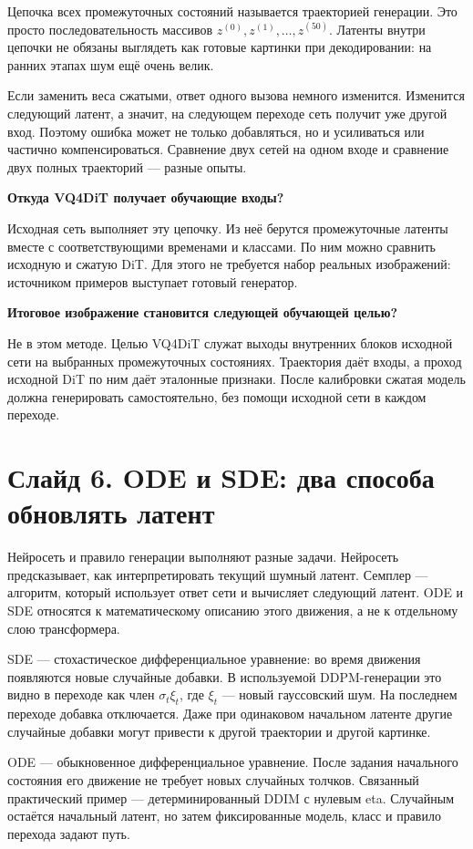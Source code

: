 \documentclass[a4paper,11pt]{article}
\newcommand{\slide}[2]{\clearpage\section*{Слайд #1. #2}}
\newcommand{\question}[1]{\par\textbf{#1}\par}
\begin{document}
Цепочка всех промежуточных состояний называется траекторией генерации.
Это просто последовательность массивов $z^{(0)},z^{(1)},\ldots,z^{(50)}$.
Латенты внутри цепочки не обязаны выглядеть как готовые картинки при
декодировании: на ранних этапах шум ещё очень велик.

Если заменить веса сжатыми, ответ одного вызова немного изменится.
Изменится следующий латент, а значит, на следующем переходе сеть
получит уже другой вход. Поэтому ошибка может не только добавляться,
но и усиливаться или частично компенсироваться. Сравнение двух сетей
на одном входе и сравнение двух полных траекторий --- разные опыты.

\question{Откуда VQ4DiT получает обучающие входы?}
Исходная сеть выполняет эту цепочку. Из неё берутся промежуточные
латенты вместе с соответствующими временами и классами. По ним можно
сравнить исходную и сжатую DiT. Для этого не требуется набор реальных
изображений: источником примеров выступает готовый генератор.

\question{Итоговое изображение становится следующей обучающей целью?}
Не в этом методе. Целью VQ4DiT служат выходы внутренних блоков исходной
сети на выбранных промежуточных состояниях. Траектория даёт входы,
а проход исходной DiT по ним даёт эталонные признаки.
После калибровки сжатая модель должна генерировать самостоятельно,
без помощи исходной сети в каждом переходе.

\slide{6}{ODE и SDE: два способа обновлять латент}
Нейросеть и правило генерации выполняют разные задачи. Нейросеть
предсказывает, как интерпретировать текущий шумный латент.
Семплер --- алгоритм, который использует ответ сети и вычисляет
следующий латент. ODE и SDE относятся к математическому описанию
этого движения, а не к отдельному слою трансформера.

SDE --- стохастическое дифференциальное уравнение: во время движения
появляются новые случайные добавки. В используемой DDPM-генерации
это видно в переходе как член $\sigma_t\xi_t$, где $\xi_t$ --- новый
гауссовский шум. На последнем переходе добавка отключается.
Даже при одинаковом начальном латенте другие случайные добавки
могут привести к другой траектории и другой картинке.

ODE --- обыкновенное дифференциальное уравнение. После задания
начального состояния его движение не требует новых случайных толчков.
Связанный практический пример --- детерминированный DDIM с нулевым eta.
Случайным остаётся начальный латент, но затем фиксированные модель,
класс и правило перехода задают путь.
\end{document}

